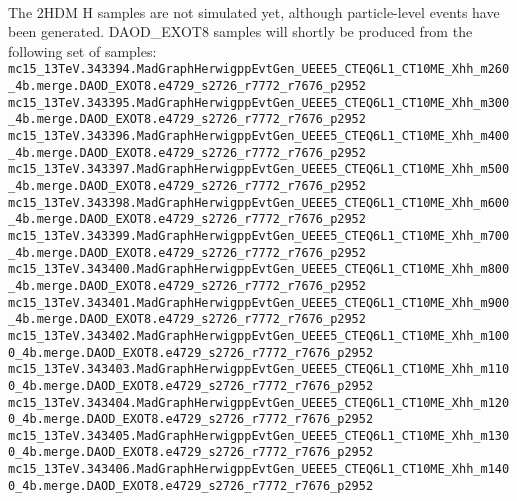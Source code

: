 \paragraph{} The 2HDM H samples are not simulated yet, although particle-level events have been generated. DAOD\_EXOT8 samples will shortly be produced from the following set of samples:
\noindent
\\
{\tiny
\verb|mc15_13TeV.343394.MadGraphHerwigppEvtGen_UEEE5_CTEQ6L1_CT10ME_Xhh_m260_4b.merge.DAOD_EXOT8.e4729_s2726_r7772_r7676_p2952|\\
\verb|mc15_13TeV.343395.MadGraphHerwigppEvtGen_UEEE5_CTEQ6L1_CT10ME_Xhh_m300_4b.merge.DAOD_EXOT8.e4729_s2726_r7772_r7676_p2952|\\
\verb|mc15_13TeV.343396.MadGraphHerwigppEvtGen_UEEE5_CTEQ6L1_CT10ME_Xhh_m400_4b.merge.DAOD_EXOT8.e4729_s2726_r7772_r7676_p2952|\\
\verb|mc15_13TeV.343397.MadGraphHerwigppEvtGen_UEEE5_CTEQ6L1_CT10ME_Xhh_m500_4b.merge.DAOD_EXOT8.e4729_s2726_r7772_r7676_p2952|\\
\verb|mc15_13TeV.343398.MadGraphHerwigppEvtGen_UEEE5_CTEQ6L1_CT10ME_Xhh_m600_4b.merge.DAOD_EXOT8.e4729_s2726_r7772_r7676_p2952|\\
\verb|mc15_13TeV.343399.MadGraphHerwigppEvtGen_UEEE5_CTEQ6L1_CT10ME_Xhh_m700_4b.merge.DAOD_EXOT8.e4729_s2726_r7772_r7676_p2952|\\
\verb|mc15_13TeV.343400.MadGraphHerwigppEvtGen_UEEE5_CTEQ6L1_CT10ME_Xhh_m800_4b.merge.DAOD_EXOT8.e4729_s2726_r7772_r7676_p2952|\\
\verb|mc15_13TeV.343401.MadGraphHerwigppEvtGen_UEEE5_CTEQ6L1_CT10ME_Xhh_m900_4b.merge.DAOD_EXOT8.e4729_s2726_r7772_r7676_p2952|\\
\verb|mc15_13TeV.343402.MadGraphHerwigppEvtGen_UEEE5_CTEQ6L1_CT10ME_Xhh_m1000_4b.merge.DAOD_EXOT8.e4729_s2726_r7772_r7676_p2952|\\
\verb|mc15_13TeV.343403.MadGraphHerwigppEvtGen_UEEE5_CTEQ6L1_CT10ME_Xhh_m1100_4b.merge.DAOD_EXOT8.e4729_s2726_r7772_r7676_p2952|\\
\verb|mc15_13TeV.343404.MadGraphHerwigppEvtGen_UEEE5_CTEQ6L1_CT10ME_Xhh_m1200_4b.merge.DAOD_EXOT8.e4729_s2726_r7772_r7676_p2952|\\
\verb|mc15_13TeV.343405.MadGraphHerwigppEvtGen_UEEE5_CTEQ6L1_CT10ME_Xhh_m1300_4b.merge.DAOD_EXOT8.e4729_s2726_r7772_r7676_p2952|\\
\verb|mc15_13TeV.343406.MadGraphHerwigppEvtGen_UEEE5_CTEQ6L1_CT10ME_Xhh_m1400_4b.merge.DAOD_EXOT8.e4729_s2726_r7772_r7676_p2952|\\
}
